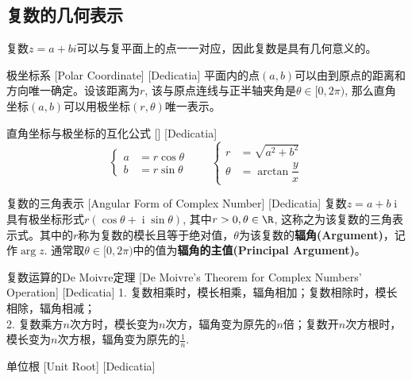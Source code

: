\documentclass[UTF8]{ctexart}
\DeclareMathOperator{\ii}{\mathrm{i}}
\begin{document}
\subsection{复数的几何表示}
复数$z=a+bi$可以与复平面上的点一一对应，因此复数是具有几何意义的。
\begin{dfn}
    [UUID]
    {极坐标系}
    [Polar Coordinate]
    [Dedicatia]
    平面内的点$(a,b)$可以由到原点的距离和方向唯一确定。设该距离为$r$, 该与原点连线与正半轴夹角是$\theta\in[0,2\pi)$, 那么直角坐标$(a,b)$可以用极坐标$(r,\theta)$唯一表示。
\end{dfn}
\begin{ppt}
    [UUID]
    {直角坐标与极坐标的互化公式}
    []
    [Dedicatia]
    \[\begin{cases}
        a&=r\cos\theta\\
        b&=r\sin\theta
    \end{cases}\qquad\begin{cases}
        r&=\sqrt{a^2+b^2}\\
        \theta&=\arctan\dfrac{y}{x}
    \end{cases}\]
\end{ppt}
\begin{dfn}
    [UUID]
    {复数的三角表示\label{dfn:AngularForm}}
    [Angular Form of Complex Number]
    [Dedicatia]
    复数$z=a+b\ii$具有极坐标形式$r(\cos\theta+\ii\sin\theta)$, 其中$r>0, \theta\in\R$, 这称之为该复数的三角表示式。其中的$r$称为复数的模长且等于绝对值，$\theta$为该复数的\textbf{辐角(Argument)}，记作$\operatorname{arg} z$. 通常取$\theta\in[0,2\pi)$中的值为\textbf{辐角的主值(Principal Argument)}。
\end{dfn}
\begin{thm}
    [UUID]
    {复数运算的De Moivre定理}
    [De Moivre's Theorem for Complex Numbers' Operation]
    [Dedicatia]
    1. 复数相乘时，模长相乘，辐角相加；复数相除时，模长相除，辐角相减；\\
    2. 复数乘方$n$次方时，模长变为$n$次方，辐角变为原先的$n$倍；复数开$n$次方根时，模长变为$n$次方根，辐角变为原先的$\frac{1}{n}$.
\end{thm}
\begin{dfn}
    [UUID]
    {单位根}
    [Unit Root]
    [Dedicatia]
\end{dfn}
\end{document}
